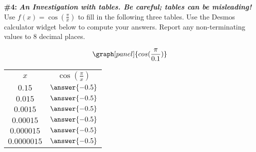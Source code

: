 \documentclass[handout,nooutcomes]{ximera}
\begin{document}
\begin{problem}{\textbf{\#4: }}{\textbf{\textit{An Investigation with tables. Be careful; tables can be misleading! }}}
Use $\displaystyle f(x)=\cos\left(\frac{\pi}{x}\right)$ to fill in the following three tables.
Use the Desmos calculator widget below to compute your answers. Report any non-terminating values to 8 decimal places.

\[
\graph[panel]{cos(\frac{\pi}{0.1})}
\]


\bigskip
\bigskip

\begin{tabular}{|c|c|}

\hline
		$x$ & $\cos\left(\frac{\pi}{x}\right)$\\
		
        $0.15$ & $\answer{-0.5}$\\
		
		$0.015$ & $\answer{-0.5}$\\
		
		$0.0015$ & $\answer{-0.5}$\\
		
		$0.00015$ & $\answer{-0.5}$\\
		
		$0.000015$ & $\answer{-0.5}$ \\
		
		$0.0000015$ & $\answer{-0.5}$ \\

		
\end{tabular}


\end{problem}
\end{document}
